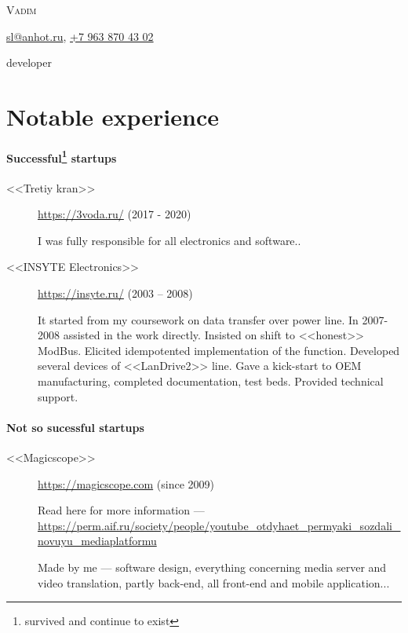 \documentclass [a4paper,10pt]{article}
\begin{document}
\begin{center}
{\scshape\LARGE Vadim \par}
\Letter\hspace{6pt}\href{mailto:sl@anhot.ru}{sl@anhot.ru},
\Mobilefone\hspace{6pt}\href{tel:+79638704302}{+7 963 870 43 02}

developer
\end{center}
\section*{Notable experience}
\paragraph{Successful\protect\footnote{survived and continue to exist} startups}
\begin{description}
\item[<<Tretiy kran>>] \url{https://3voda.ru/} (2017 - 2020) 

I was fully responsible for all electronics and software..

\item[<<INSYTE Electronics>>] \url{https://insyte.ru/} (2003 -- 2008)

It started from my coursework on data transfer over power line. In 2007-
2008 assisted in the work directly. Insisted on shift to <<honest>> ModBus.
Elicited idempotented implementation of the function. Developed several
devices of <<LanDrive2>> line. Gave a kick-start to OEM manufacturing,
completed documentation, test beds. Provided technical support.
\end{description}

\paragraph{Not so sucessful startups}
\begin{description}
\item[<<Magicscope>>] \url{https://magicscope.com} (since 2009)

Read here for more information --- \url{https://perm.aif.ru/society/people/youtube_otdyhaet_permyaki_sozdali_novuyu_mediaplatformu}
	
Made by me --- software design, everything concerning media server and
video translation, partly back-end, all front-end and mobile application...
\end{description}
\end{document}
